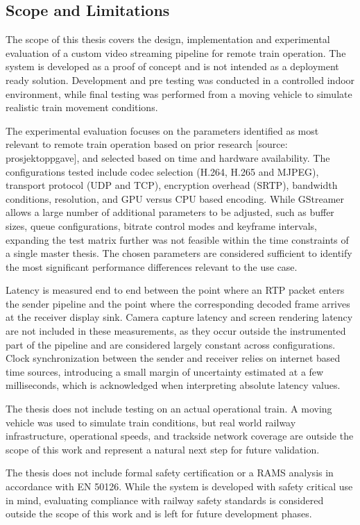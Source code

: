 \subsection{Scope and Limitations}

The scope of this thesis covers the design, implementation and experimental evaluation of a custom video streaming pipeline for remote train operation. The system is developed as a proof of concept and is not intended as a deployment ready solution. Development and pre testing was conducted in a controlled indoor environment, while final testing was performed from a moving vehicle to simulate realistic train movement conditions.

The experimental evaluation focuses on the parameters identified as most relevant to remote train operation based on prior research [source: prosjektoppgave], and selected based on time and hardware availability. The configurations tested include codec selection (H.264, H.265 and MJPEG), transport protocol (UDP and TCP), encryption overhead (SRTP), bandwidth conditions, resolution, and GPU versus CPU based encoding. While GStreamer allows a large number of additional parameters to be adjusted, such as buffer sizes, queue configurations, bitrate control modes and keyframe intervals, expanding the test matrix further was not feasible within the time constraints of a single master thesis. The chosen parameters are considered sufficient to identify the most significant performance differences relevant to the use case.

Latency is measured end to end between the point where an RTP packet enters the sender pipeline and the point where the corresponding decoded frame arrives at the receiver display sink. Camera capture latency and screen rendering latency are not included in these measurements, as they occur outside the instrumented part of the pipeline and are considered largely constant across configurations. Clock synchronization between the sender and receiver relies on internet based time sources, introducing a small margin of uncertainty estimated at a few milliseconds, which is acknowledged when interpreting absolute latency values.

The thesis does not include testing on an actual operational train. A moving vehicle was used to simulate train conditions, but real world railway infrastructure, operational speeds, and trackside network coverage are outside the scope of this work and represent a natural next step for future validation.

The thesis does not include formal safety certification or a RAMS analysis in accordance with EN 50126. While the system is developed with safety critical use in mind, evaluating compliance with railway safety standards is considered outside the scope of this work and is left for future development phases.

